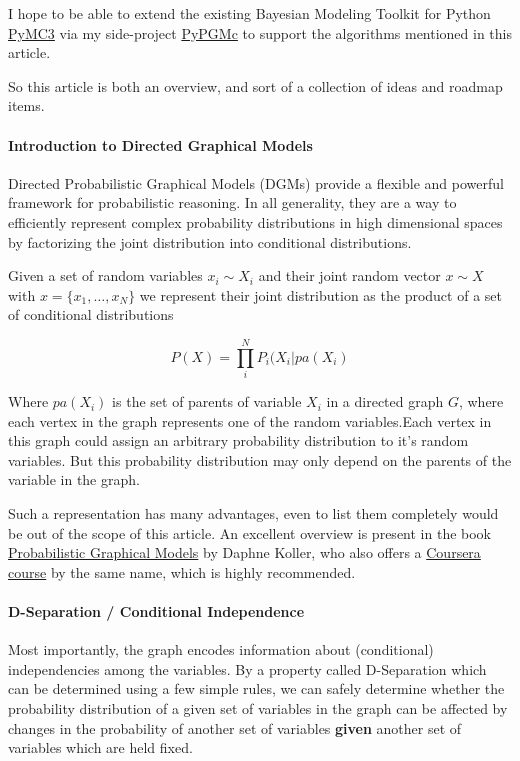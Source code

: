\documentclass[letterpaper,10pt,english]{/home/londenberg/python-env/clean/lib/python2.7/site-packages/sphinx/texinputs/sphinxhowto}
\begin{document}
I hope to be able to extend the existing Bayesian Modeling Toolkit for
Python \href{https://github.com/pymc-devs/pymc}{PyMC3} via my
side-project \href{https://github.com/kadeng/pypgmc}{PyPGMc} to support
the algorithms mentioned in this article.

So this article is both an overview, and sort of a collection of ideas
and roadmap items.\paragraph{Introduction to Directed Graphical Models}

Directed Probabilistic Graphical Models (DGMs) provide a flexible and
powerful framework for probabilistic reasoning. In all generality, they
are a way to efficiently represent complex probability distributions in
high dimensional spaces by factorizing the joint distribution into
conditional distributions.

Given a set of random variables $x_i \sim X_i$ and their joint random
vector $x \sim X$ with $x = \{ x_1, \ldots, x_N \}$ we represent their
joint distribution as the product of a set of conditional distributions

\[
P(X) = \prod_i^N P_i(X_i|{pa}(X_i) 
\]

Where $pa(X_i)$ is the set of parents of variable $X_i$ in a directed
graph $G$, where each vertex in the graph represents one of the random
variables.Each vertex in this graph could assign an arbitrary probability
distribution to it's random variables. But this probability distribution
may only depend on the parents of the variable in the graph.

Such a representation has many advantages, even to list them completely
would be out of the scope of this article. An excellent overview is
present in the book
\href{http://mitpress.mit.edu/books/probabilistic-graphical-models}{Probabilistic
Graphical Models} by Daphne Koller, who also offers a
\href{https://www.coursera.org/course/pgm}{Coursera course} by the same
name, which is highly recommended.\paragraph{D-Separation / Conditional Independence}

Most importantly, the graph encodes information about (conditional)
independencies among the variables. By a property called D-Separation
which can be determined using a few simple rules, we can safely
determine whether the probability distribution of a given set of
variables in the graph can be affected by changes in the probability of
another set of variables \textbf{given} another set of variables which
are held fixed.
\end{document}
